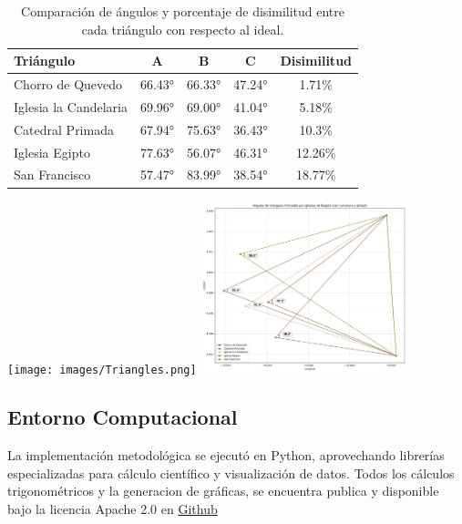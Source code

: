 \documentclass[a4paper,alpha-refs]{eSpectra}
\begin{document}
\begin{table}[h!]
\centering
\begin{tabular}{|l|c|c|c|c|}
\hline
\textbf{Triángulo} & \textbf{A} & \textbf{B} & \textbf{C} & \textbf{Disimilitud} \\ \hline
Chorro de Quevedo & 66.43° & 66.33° & 47.24° & 1.71\% \\ \hline
Iglesia la Candelaria & 69.96° & 69.00° & 41.04° & 5.18\% \\ \hline
Catedral Primada & 67.94° & 75.63° & 36.43° & 10.3\% \\ \hline
Iglesia Egipto & 77.63° & 56.07° & 46.31° & 12.26\% \\ \hline
San Francisco & 57.47° & 83.99° & 38.54° & 18.77\% \\ \hline
\end{tabular}
\smallskip
\caption{Comparación de ángulos y porcentaje de disimilitud entre cada triángulo con respecto al ideal.}
\label{Cuadro 2}
\end{table}
\vspace{-\baselineskip}  %
\vspace{-\baselineskip}  %
\centering
\texttt{[image: images/Triangles.png]}
    \label{Figura 4}
   \includegraphics[width=0.45\textwidth]{images/triangles_with_arcs.png}
    \label{Figura 5}

\justifying
\subsection{Entorno Computacional}
La implementación metodológica se ejecutó en Python, aprovechando librerías especializadas para cálculo científico y visualización de datos. Todos los cálculos trigonométricos y la generacion de gráficas, se encuentra publica y disponible bajo la licencia Apache 2.0 en \href{https://github.com/Usuy-Leon/El-secreto-astronomico-de-Guadalupe-Monserrate}{Github}
\end{document}

